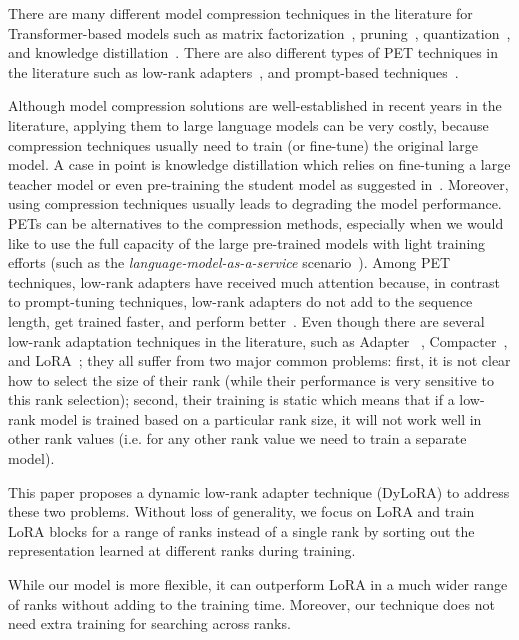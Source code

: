 There are many different model compression techniques in the literature for Transformer-based models such as matrix factorization~\cite{noach2020compressing, tahaei2021kroneckerbert}, pruning~\cite{wang2019structured}, quantization~\cite{tao2022compression,prato2020fully}, and knowledge distillation~\cite{hinton2015distilling, li2021dynamic, jafari2021annealing,passban2020alp,rashid2021mate}. There are also different types of PET techniques in the literature such as low-rank adapters~\cite{wang2020k, karimi2021compacter,adapter,lora}, and prompt-based techniques~\cite{lester2021power}.     

Although model compression solutions are well-established in recent years in the literature, applying them to large language models can be very costly, because compression techniques usually need to train (or fine-tune) the original large model. A case in point is knowledge distillation which relies on fine-tuning a large teacher model or even pre-training the student model as suggested in~\cite{jiao2019tinybert}. Moreover, using compression techniques usually leads to degrading the model performance. PETs can be alternatives to the compression methods, especially when we would like to use the full capacity of the large pre-trained models with light training efforts (such as the \textit{language-model-as-a-service} scenario~\cite{sun2022black}). Among PET techniques, low-rank adapters have received much attention because, in contrast to prompt-tuning techniques, low-rank adapters do not add to the sequence length, get trained faster, and perform better~\cite{karimi2021compacter}. Even though there are several low-rank adaptation techniques in the literature, such as Adapter ~\cite{adapter}, Compacter~\cite{karimi2021compacter}, and LoRA~\cite{lora}; they all suffer from two major common problems: first, it is not clear how to select the size of their rank (while their performance is very sensitive to this rank selection); second, their training is static which means that if a low-rank model is trained based on a particular rank size, it will not work well in other rank values (i.e. for any other rank value we need to train a separate model).  

This paper proposes a dynamic low-rank adapter technique (DyLoRA) to address these two problems. Without loss of generality, we focus on LoRA\cite{hu2021lora} and train LoRA blocks for a range of ranks instead of a single rank by sorting out the representation learned at different ranks during training. 

While our model is more flexible, it can outperform LoRA in a much wider range of ranks without adding to the training time. Moreover, our technique does not need extra training for searching across ranks. 

